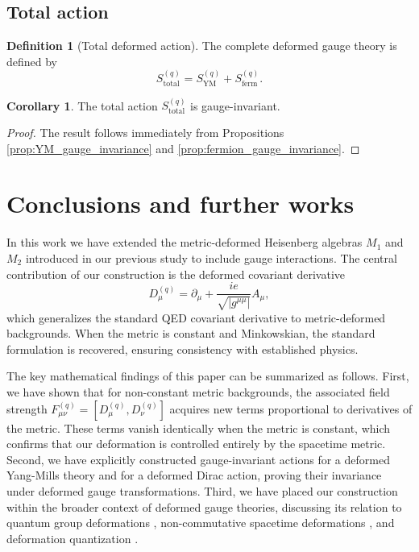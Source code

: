 \documentclass[12pt,a4paper]{article}
\theoremstyle{plain}
\theoremstyle{definition}
\newtheorem{definition}[theorem]{Definition}
\newtheorem{corollary}[theorem]{Corollary}
\begin{document}
\subsection{Total action}

\begin{definition}[Total deformed action]

The complete deformed gauge theory is defined by
\begin{equation}
S_{\mathrm{total}}^{(q)}
=
S_{\mathrm{YM}}^{(q)}
+
S_{\mathrm{ferm}}^{(q)}.
\label{eq:total_action}
\end{equation}

\end{definition}

\begin{corollary}

The total action \(S_{\mathrm{total}}^{(q)}\) is gauge-invariant.

\end{corollary}

\begin{proof}

The result follows immediately from Propositions
\ref{prop:YM_gauge_invariance}
and
\ref{prop:fermion_gauge_invariance}.

\end{proof}


\section{Conclusions and further works}
\label{sec:conclusions}

In this work we have extended the metric-deformed Heisenberg algebras \(M_1\) and \(M_2\) introduced in our previous study \cite{Jaramillo2026a} to include gauge interactions. The central contribution of our construction is the deformed covariant derivative
\[
D_\mu^{(q)} = \partial_\mu + \frac{ie}{\sqrt{|g^{\mu\mu}|}} A_\mu,
\]
which generalizes the standard QED covariant derivative to metric-deformed backgrounds. When the metric is constant and Minkowskian, the standard formulation is recovered, ensuring consistency with established physics.

The key mathematical findings of this paper can be summarized as follows. First, we have shown that for non-constant metric backgrounds, the associated field strength \(F_{\mu\nu}^{(q)} = [D_\mu^{(q)}, D_\nu^{(q)}]\) acquires new terms proportional to derivatives of the metric. These terms vanish identically when the metric is constant, which confirms that our deformation is controlled entirely by the spacetime metric. Second, we have explicitly constructed gauge-invariant actions for a deformed Yang-Mills theory and for a deformed Dirac action, proving their invariance under deformed gauge transformations. Third, we have placed our construction within the broader context of deformed gauge theories, discussing its relation to quantum group deformations \cite{Castellani1992, Watts1997}, non-commutative spacetime deformations \cite{Kupriyanov2020}, and deformation quantization \cite{vanNuland2021, Anco2004}.
\end{document}
